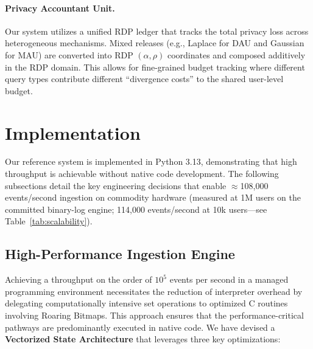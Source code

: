 \documentclass[sigconf,anonymous,review]{acmart}
\begin{document}
\paragraph{Privacy Accountant Unit.} Our system utilizes a unified RDP ledger that tracks the total privacy loss across heterogeneous mechanisms. Mixed releases (e.g., Laplace for DAU and Gaussian for MAU) are converted into RDP $(\alpha, \rho)$ coordinates and composed additively in the RDP domain. This allows for fine-grained budget tracking where different query types contribute different ``divergence costs'' to the shared user-level budget.

\section{Implementation}
\label{sec:implementation}

Our reference system is implemented in Python 3.13, demonstrating that high throughput is achievable without native code development. The following subsections detail the key engineering decisions that enable $\approx$108,000 events/second ingestion on commodity hardware (measured at 1M users on the committed binary-log engine; 114,000 events/second at 10k users---see Table~\ref{tab:scalability}).

\subsection{High-Performance Ingestion Engine}

Achieving a throughput on the order of $10^5$ events per second in a managed programming environment necessitates the reduction of interpreter overhead by delegating computationally intensive set operations to optimized C routines involving Roaring Bitmaps. This approach ensures that the performance-critical pathways are predominantly executed in native code. We have devised a \textbf{Vectorized State Architecture} that leverages three key optimizations:
\end{document}
